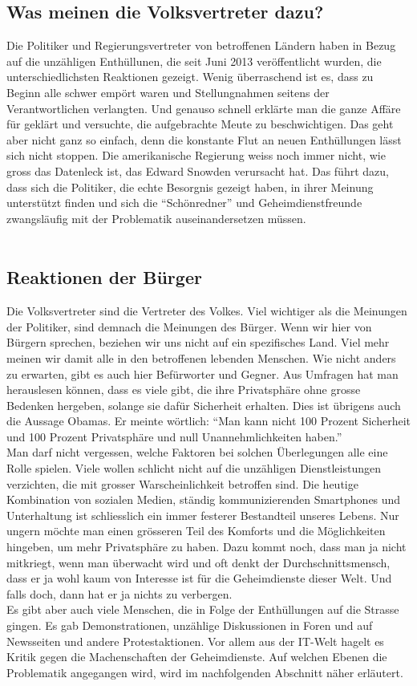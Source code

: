 \subsection{Was meinen die Volksvertreter dazu?}
Die Politiker und Regierungsvertreter von betroffenen Ländern haben in Bezug auf die unzähligen Enthüllunen, die seit Juni 2013 veröffentlicht wurden, die unterschiedlichsten Reaktionen gezeigt.
Wenig überraschend ist es, dass zu Beginn alle schwer empört waren und Stellungnahmen seitens der Verantwortlichen verlangten.
Und genauso schnell erklärte man die ganze Affäre für geklärt und versuchte, die aufgebrachte Meute zu beschwichtigen. Das geht aber nicht ganz so einfach, denn die konstante Flut an neuen Enthüllungen lässt sich nicht stoppen.
Die amerikanische Regierung weiss noch immer nicht, wie gross das Datenleck ist, das Edward Snowden verursacht hat.
Das führt dazu, dass sich die Politiker, die echte Besorgnis gezeigt haben, in ihrer Meinung unterstützt finden und sich die ``Schönredner'' und Geheimdienstfreunde zwangsläufig mit der Problematik auseinandersetzen müssen.
\\
\\


\subsection{Reaktionen der Bürger}
Die Volksvertreter sind die Vertreter des Volkes. Viel wichtiger als die Meinungen der Politiker, sind demnach die Meinungen des Bürger. Wenn wir hier von Bürgern sprechen, beziehen wir uns nicht auf ein spezifisches Land. Viel mehr meinen wir damit alle in den betroffenen lebenden Menschen. Wie nicht anders zu erwarten, gibt es auch hier Befürworter und Gegner. Aus Umfragen hat man herauslesen können, dass es viele gibt, die ihre Privatsphäre ohne grosse Bedenken hergeben, solange sie dafür Sicherheit erhalten. Dies ist übrigens auch die Aussage Obamas. Er meinte wörtlich: ``Man kann nicht 100 Prozent Sicherheit und 100 Prozent Privatsphäre und null Unannehmlichkeiten haben.''
\\
Man darf nicht vergessen, welche Faktoren bei solchen Überlegungen alle eine Rolle spielen. Viele wollen schlicht nicht auf die unzähligen Dienstleistungen verzichten, die mit grosser Warscheinlichkeit betroffen sind. Die heutige Kombination von sozialen Medien, ständig kommunizierenden Smartphones und Unterhaltung ist schliesslich ein immer festerer Bestandteil unseres Lebens. Nur ungern möchte man einen grösseren Teil des Komforts und die Möglichkeiten hingeben, um mehr Privatsphäre zu haben. Dazu kommt noch, dass man ja nicht mitkriegt, wenn man überwacht wird und oft denkt der Durchschnittsmensch, dass er ja wohl kaum von Interesse ist für die Geheimdienste dieser Welt. Und falls doch, dann hat er ja nichts zu verbergen.
\\
Es gibt aber auch viele Menschen, die in Folge der Enthüllungen auf die Strasse gingen. Es gab Demonstrationen, unzählige Diskussionen in Foren und auf Newsseiten und andere Protestaktionen. Vor allem aus der IT-Welt hagelt es Kritik gegen die Machenschaften der Geheimdienste. Auf welchen Ebenen die Problematik angegangen wird, wird im nachfolgenden Abschnitt näher erläutert.
